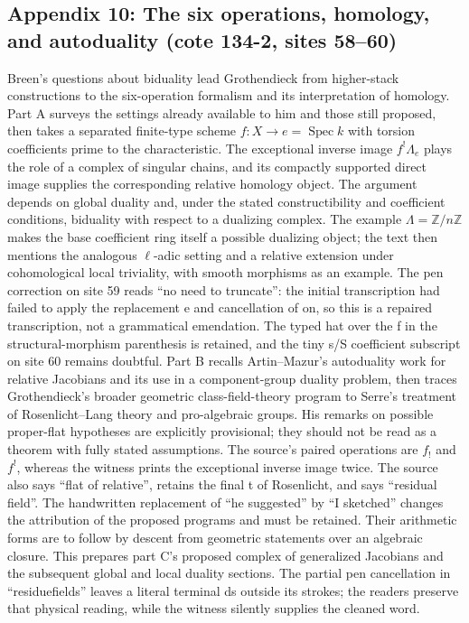 \documentclass[10pt,oneside]{book}
\begin{document}
\subsection*{Appendix 10: The six operations, homology, and autoduality (cote 134-2, sites 58--60)}
Breen's questions about biduality lead Grothendieck from higher-stack constructions to the six-operation formalism and its interpretation of homology. Part A surveys the settings already available to him and those still proposed, then takes a separated finite-type scheme $f:X\to e=\operatorname{Spec}k$ with torsion coefficients prime to the characteristic. The exceptional inverse image $f^!\Lambda_e$ plays the role of a complex of singular chains, and its compactly supported direct image supplies the corresponding relative homology object. The argument depends on global duality and, under the stated constructibility and coefficient conditions, biduality with respect to a dualizing complex. The example $\Lambda=\mathbb Z/n\mathbb Z$ makes the base coefficient ring itself a possible dualizing object; the text then mentions the analogous $\ell$-adic setting and a relative extension under cohomological local triviality, with smooth morphisms as an example. The pen correction on site 59 reads ``no need to truncate'': the initial transcription had failed to apply the replacement e and cancellation of on, so this is a repaired transcription, not a grammatical emendation. The typed hat over the f in the structural-morphism parenthesis is retained, and the tiny s/S coefficient subscript on site 60 remains doubtful. Part B recalls Artin--Mazur's autoduality work for relative Jacobians and its use in a component-group duality problem, then traces Grothendieck's broader geometric class-field-theory program to Serre's treatment of Rosenlicht--Lang theory and pro-algebraic groups. His remarks on possible proper-flat hypotheses are explicitly provisional; they should not be read as a theorem with fully stated assumptions. The source's paired operations are $f_!$ and $f^!$, whereas the witness prints the exceptional inverse image twice. The source also says ``flat of relative'', retains the final t of Rosenlicht, and says ``residual field''. The handwritten replacement of ``he suggested'' by ``I sketched'' changes the attribution of the proposed programs and must be retained. Their arithmetic forms are to follow by descent from geometric statements over an algebraic closure. This prepares part C's proposed complex of generalized Jacobians and the subsequent global and local duality sections. The partial pen cancellation in ``residuefields'' leaves a literal terminal ds outside its strokes; the readers preserve that physical reading, while the witness silently supplies the cleaned word.
\end{document}
